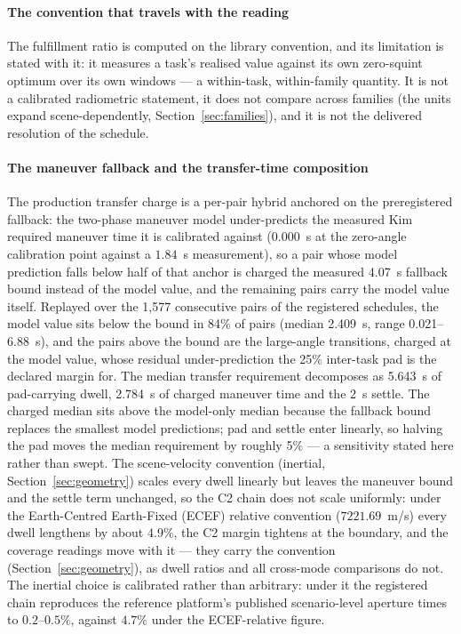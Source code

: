 \documentclass[preprint,authoryear]{elsarticle}
\begin{document}
\paragraph{The convention that travels with the reading} The fulfillment ratio is computed on the library convention, and its limitation is stated with it: it measures a task's realised value against its own zero-squint optimum over its own windows --- a within-task, within-family quantity. It is not a calibrated radiometric statement, it does not compare across families (the units expand scene-dependently, Section~\ref{sec:families}), and it is not the delivered resolution of the schedule.

\paragraph{The maneuver fallback and the transfer-time composition} The production transfer charge is a per-pair hybrid anchored on the preregistered fallback: the two-phase maneuver model under-predicts the measured Kim required maneuver time it is calibrated against (0.000~s at the zero-angle calibration point against a $1.84$~s measurement), so a pair whose model prediction falls below half of that anchor is charged the measured 4.07~s fallback bound instead of the model value, and the remaining pairs carry the model value itself. Replayed over the 1,577 consecutive pairs of the registered schedules, the model value sits below the bound in 84\% of pairs (median 2.409~s, range 0.021--6.88~s), and the pairs above the bound are the large-angle transitions, charged at the model value, whose residual under-prediction the 25\% inter-task pad is the declared margin for. The median transfer requirement decomposes as 5.643~s of pad-carrying dwell, 2.784~s of charged maneuver time and the 2~s settle. The charged median sits above the model-only median because the fallback bound replaces the smallest model predictions; pad and settle enter linearly, so halving the pad moves the median requirement by roughly 5\% --- a sensitivity stated here rather than swept. The scene-velocity convention (inertial, Section~\ref{sec:geometry}) scales every dwell linearly but leaves the maneuver bound and the settle term unchanged, so the C2 chain does not scale uniformly: under the Earth-Centred Earth-Fixed (ECEF) relative convention ($7221.69$~m/s) every dwell lengthens by about $4.9\%$, the C2 margin tightens at the boundary, and the coverage readings move with it --- they carry the convention (Section~\ref{sec:geometry}), as dwell ratios and all cross-mode comparisons do not. The inertial choice is calibrated rather than arbitrary: under it the registered chain reproduces the reference platform's published scenario-level aperture times to $0.2$--$0.5\%$, against $4.7\%$ under the ECEF-relative figure.
\end{document}
